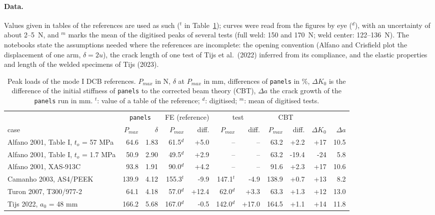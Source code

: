 \paragraph{Data.} Values given in tables of the references are used as such ($^{t}$ in Table~\ref{tab:cz-dev-val-peaks}); curves were read from the figures by eye ($^{d}$), with an uncertainty of about 2--5~N, and $^{m}$ marks the mean of the digitised peaks of several tests (full weld: 150 and 170~N; weld center: 122--136~N). The notebooks state the assumptions needed where the references are incomplete: the opening convention (Alfano and Crisfield plot the displacement of one arm, $\delta = 2u$), the crack length of one test of Tijs et al.\ (2022) inferred from its compliance, and the elastic properties and length of the welded specimens of Tijs (2023).

\begin{table}[htb]
	\centering
	\caption{Peak loads of the mode I DCB references. $P_{max}$ in N, $\delta$ at $P_{max}$ in mm, differences of \texttt{panels} in \%, $\Delta K_0$ is the difference of the initial stiffness of \texttt{panels} to the corrected beam theory (CBT), $\Delta a$ the crack growth of the \texttt{panels} run in mm. $^{t}$: value of a table of the reference; $^{d}$: digitised; $^{m}$: mean of digitised tests.}
	\label{tab:cz-dev-val-peaks}
	\scriptsize
	\setlength{\tabcolsep}{3pt}
	\begin{tabular}{lrrrrrrrrrr}
		\toprule
		& \multicolumn{2}{c}{\texttt{panels}} & \multicolumn{2}{c}{FE (reference)} & \multicolumn{2}{c}{test} & \multicolumn{2}{c}{CBT} & & \\
		case & $P_{max}$ & $\delta$ & $P_{max}$ & diff. & $P_{max}$ & diff. & $P_{max}$ & diff. & $\Delta K_0$ & $\Delta a$ \\
		\midrule
		Alfano 2001, Table I, $t_o$ = 57 MPa & 64.6 & 1.83 & 61.5$^{d}$ & +5.0 & -- & -- & 63.2 & +2.2 & +17 & 10.5 \\
		Alfano 2001, Table I, $t_o$ = 1.7 MPa & 50.9 & 2.90 & 49.5$^{d}$ & +2.9 & -- & -- & 63.2 & -19.4 & -24 & 5.8 \\
		Alfano 2001, XAS-913C & 93.8 & 1.91 & 90.0$^{d}$ & +4.2 & -- & -- & 91.6 & +2.3 & +17 & 10.6 \\
		Camanho 2003, AS4/PEEK & 139.9 & 4.12 & 155.3$^{t}$ & -9.9 & 147.1$^{t}$ & -4.9 & 138.9 & +0.7 & +13 & 8.2 \\
		Turon 2007, T300/977-2 & 64.1 & 4.18 & 57.0$^{d}$ & +12.4 & 62.0$^{d}$ & +3.3 & 63.3 & +1.3 & +12 & 13.0 \\
		Tijs 2022, $a_0$ = 48 mm & 166.2 & 5.68 & 167.0$^{d}$ & -0.5 & 142.0$^{d}$ & +17.0 & 164.5 & +1.1 & +14 & 11.8 \\

\end{tabular}
\end{table}
